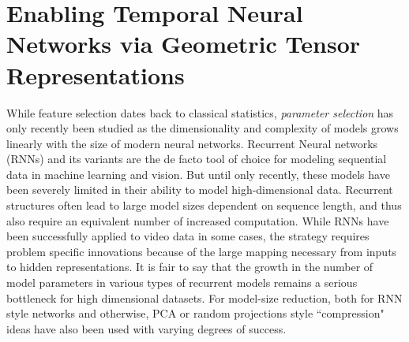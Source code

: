 \chapter{Enabling Temporal Neural Networks via Geometric Tensor Representations} \label{chap:ott} 

While feature selection dates back to classical statistics, 
\textit{parameter selection} has only recently been
studied as
the dimensionality and complexity of models grows
linearly with the size of modern neural networks.
Recurrent Neural networks (RNNs) and its variants are the de facto 
tool of choice 
for modeling sequential data in machine learning and vision.
But until only recently, these models have been severely limited in their ability to model high-dimensional data.
Recurrent structures often lead to large model sizes dependent on sequence length, and thus also require an equivalent number of increased computation.
While RNNs have been successfully applied to video data in some cases, the strategy 
requires problem specific innovations because of the large mapping necessary 
from inputs to hidden representations. It is fair to say that the growth 
in the number of model parameters in various types of 
recurrent models remains a serious bottleneck for high 
dimensional datasets. 
%
For model-size reduction, both for RNN style networks and otherwise, 
PCA or random projections \citep{ye2005two,bingham2001random} style ``compression" ideas have 
also been used with varying degrees of success.

